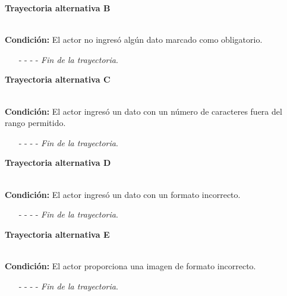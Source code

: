 \hypertarget{CU11-2:TAB}{\textbf{Trayectoria alternativa B}}\\
\noindent \textbf{Condición:} El actor no ingresó algún dato marcado como obligatorio.
\begin{enumerate}
	\UCpaso[\UCsist] Muestra el mensaje  señalando el campo que presenta el error en la pantalla .
	\UCpaso Regresa al paso \ref{CU11.2-P5} de la trayectoria principal.
	\item[- -] - - {\em {Fin de la trayectoria}}.%
\end{enumerate}
\hypertarget{CU11-2:TAC}{\textbf{Trayectoria alternativa C}}\\
\noindent \textbf{Condición:} El actor ingresó un dato con un número de caracteres fuera del rango permitido.
\begin{enumerate}
	\UCpaso[\UCsist] Muestra el mensaje  señalando el campo que presenta el error en la pantalla .
	\UCpaso Regresa al paso \ref{CU11.2-P5} de la trayectoria principal.
	\item[- -] - - {\em {Fin de la trayectoria}}.%
\end{enumerate}
\hypertarget{CU11-2:TAD}{\textbf{Trayectoria alternativa D}}\\
\noindent \textbf{Condición:} El actor ingresó un dato con un formato incorrecto.
\begin{enumerate}
	\UCpaso[\UCsist] Muestra el mensaje  señalando el campo que presenta el error en la pantalla .
	\UCpaso Regresa al paso \ref{CU11.2-P5} de la trayectoria principal.
	\item[- -] - - {\em {Fin de la trayectoria}}.
\end{enumerate}
\hypertarget{CU11-2:TAE}{\textbf{Trayectoria alternativa E}}\\
\noindent \textbf{Condición:} El actor proporciona una imagen de formato incorrecto.
\begin{enumerate}
	\UCpaso[\UCsist] Muestra el mensaje  señalando el campo que presenta el error en la pantalla .
	\UCpaso Regresa al paso \ref{CU11.2-P6} de la trayectoria principal.
	\item[- -] - - {\em {Fin de la trayectoria}}.
\end{enumerate}
